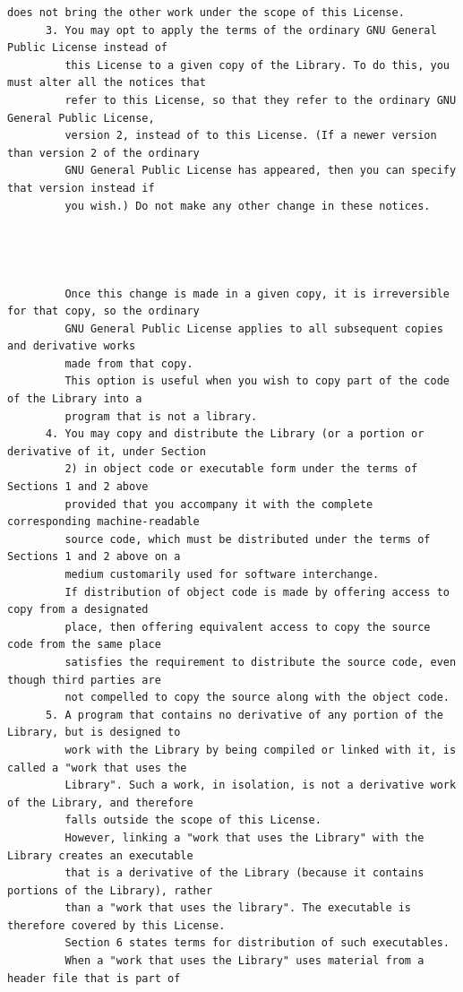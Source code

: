 \begin{lstlisting}[basicstyle=\ttfamily\footnotesize,breaklines=true]
         does not bring the other work under the scope of this License.
      3. You may opt to apply the terms of the ordinary GNU General Public License instead of
         this License to a given copy of the Library. To do this, you must alter all the notices that
         refer to this License, so that they refer to the ordinary GNU General Public License,
         version 2, instead of to this License. (If a newer version than version 2 of the ordinary
         GNU General Public License has appeared, then you can specify that version instead if
         you wish.) Do not make any other change in these notices.




         Once this change is made in a given copy, it is irreversible for that copy, so the ordinary
         GNU General Public License applies to all subsequent copies and derivative works
         made from that copy.
         This option is useful when you wish to copy part of the code of the Library into a
         program that is not a library.
      4. You may copy and distribute the Library (or a portion or derivative of it, under Section
         2) in object code or executable form under the terms of Sections 1 and 2 above
         provided that you accompany it with the complete corresponding machine-readable
         source code, which must be distributed under the terms of Sections 1 and 2 above on a
         medium customarily used for software interchange.
         If distribution of object code is made by offering access to copy from a designated
         place, then offering equivalent access to copy the source code from the same place
         satisfies the requirement to distribute the source code, even though third parties are
         not compelled to copy the source along with the object code.
      5. A program that contains no derivative of any portion of the Library, but is designed to
         work with the Library by being compiled or linked with it, is called a "work that uses the
         Library". Such a work, in isolation, is not a derivative work of the Library, and therefore
         falls outside the scope of this License.
         However, linking a "work that uses the Library" with the Library creates an executable
         that is a derivative of the Library (because it contains portions of the Library), rather
         than a "work that uses the library". The executable is therefore covered by this License.
         Section 6 states terms for distribution of such executables.
         When a "work that uses the Library" uses material from a header file that is part of

\end{lstlisting}
